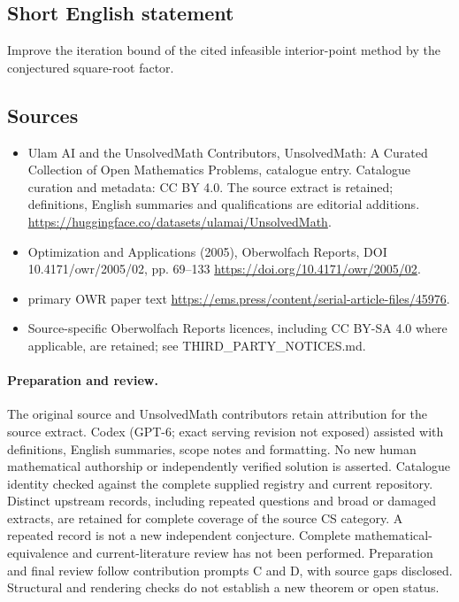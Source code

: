 \documentclass[11pt]{article}
\begin{document}
\subsection{Short English statement}
Improve the iteration bound of the cited infeasible interior-point method by the conjectured square-root factor.
\subsection{Sources}
\begin{itemize}
\item[\hypertarget{source:statement:1}{S1}] Ulam AI and the UnsolvedMath Contributors, UnsolvedMath: A Curated Collection of Open Mathematics Problems, catalogue entry. Catalogue curation and metadata: CC BY 4.0. The source extract is retained; definitions, English summaries and qualifications are editorial additions.
\url{https://huggingface.co/datasets/ulamai/UnsolvedMath}.
\item[\hypertarget{source:statement:2}{S2}] Optimization and Applications (2005), Oberwolfach Reports, DOI 10.4171/owr/2005/02, pp. 69--133
\url{https://doi.org/10.4171/owr/2005/02}.
\item[\hypertarget{source:statement:3}{S3}] primary OWR paper text
\url{https://ems.press/content/serial-article-files/45976}.
\item Source-specific Oberwolfach Reports licences, including CC BY-SA 4.0 where applicable, are retained; see THIRD\_PARTY\_NOTICES.md.
\end{itemize}
\paragraph{Preparation and review.}
The original source and UnsolvedMath contributors retain attribution for the source extract. Codex (GPT-6; exact serving revision not exposed) assisted with definitions, English summaries, scope notes and formatting. No new human mathematical authorship or independently verified solution is asserted. Catalogue identity checked against the complete supplied registry and current repository. Distinct upstream records, including repeated questions and broad or damaged extracts, are retained for complete coverage of the source CS category. A repeated record is not a new independent conjecture. Complete mathematical-equivalence and current-literature review has not been performed. Preparation and final review follow contribution prompts C and D, with source gaps disclosed. Structural and rendering checks do not establish a new theorem or open status.
\label{end:statement}
\end{document}
